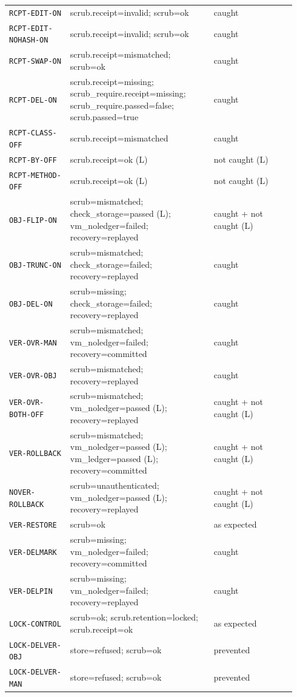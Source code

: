 \begin{tabular}{@{}p{0.2\linewidth}p{0.47\linewidth}p{0.27\linewidth}@{}}
\texttt{RCPT-EDIT-ON} & scrub.receipt=invalid; scrub=ok & caught \\
\texttt{RCPT-EDIT-NOHASH-ON} & scrub.receipt=invalid; scrub=ok & caught \\
\texttt{RCPT-SWAP-ON} & scrub.receipt=mismatched; scrub=ok & caught \\
\texttt{RCPT-DEL-ON} & scrub.receipt=missing; scrub\_require.receipt=missing; scrub\_require.passed=false; scrub.passed=true & caught \\
\texttt{RCPT-CLASS-OFF} & scrub.receipt=mismatched & caught \\
\texttt{RCPT-BY-OFF} & scrub.receipt=ok (L) & not caught (L) \\
\texttt{RCPT-METHOD-OFF} & scrub.receipt=ok (L) & not caught (L) \\
\texttt{OBJ-FLIP-ON} & scrub=mismatched; check\_storage=passed (L); vm\_noledger=failed; recovery=replayed & caught + not caught (L) \\
\texttt{OBJ-TRUNC-ON} & scrub=mismatched; check\_storage=failed; recovery=replayed & caught \\
\texttt{OBJ-DEL-ON} & scrub=missing; check\_storage=failed; recovery=replayed & caught \\
\texttt{VER-OVR-MAN} & scrub=mismatched; vm\_noledger=failed; recovery=committed & caught \\
\texttt{VER-OVR-OBJ} & scrub=mismatched; recovery=replayed & caught \\
\texttt{VER-OVR-BOTH-OFF} & scrub=mismatched; vm\_noledger=passed (L); recovery=replayed & caught + not caught (L) \\
\texttt{VER-ROLLBACK} & scrub=mismatched; vm\_noledger=passed (L); vm\_ledger=passed (L); recovery=committed & caught + not caught (L) \\
\texttt{NOVER-ROLLBACK} & scrub=unauthenticated; vm\_noledger=passed (L); recovery=replayed & caught + not caught (L) \\
\texttt{VER-RESTORE} & scrub=ok & as expected \\
\texttt{VER-DELMARK} & scrub=missing; vm\_noledger=failed; recovery=committed & caught \\
\texttt{VER-DELPIN} & scrub=missing; vm\_noledger=failed; recovery=replayed & caught \\
\texttt{LOCK-CONTROL} & scrub=ok; scrub.retention=locked; scrub.receipt=ok & as expected \\
\texttt{LOCK-DELVER-OBJ} & store=refused; scrub=ok & prevented \\
\texttt{LOCK-DELVER-MAN} & store=refused; scrub=ok & prevented \\

\end{tabular}
